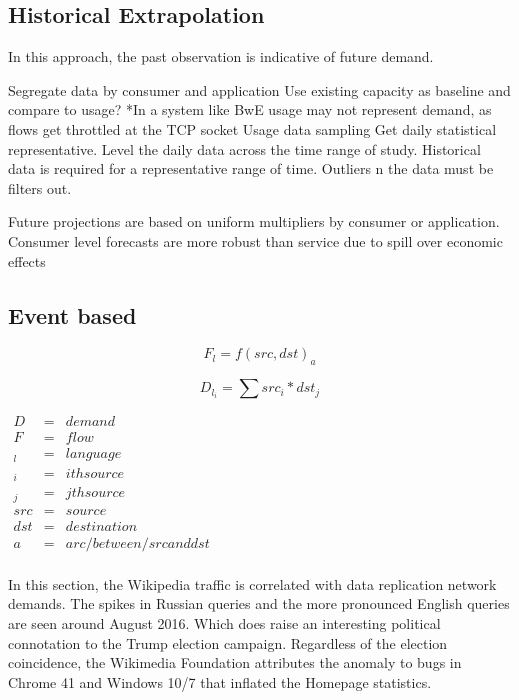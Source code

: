 \documentclass[conference]{IEEEtran}
\begin{document}
\subsection{Historical Extrapolation}
In this approach, the past observation is indicative of future demand. 

Segregate data by consumer and application
Use existing capacity as baseline and compare to usage? *In a system like BwE usage may not represent demand, as flows get throttled at the TCP socket
Usage data sampling
	Get daily statistical representative.
	Level the daily data across the time range of study.
	Historical data is required for a representative range of time. Outliers n the data must be filters out.
	
Future projections are based on uniform multipliers by consumer or application. 
Consumer level forecasts are more robust than service due to spill over economic effects 


\subsection{Event based}


\begin{equation}
\label{replication_time}
F_l = f(src, dst)_a  
\end{equation}

\begin{equation}
\label{replication_time}
D_{l_i} = \sum{src_i * dst_j}
\end{equation}

\begin{center}
\begin{small}
$
\begin{array}{rcl}
 D   &=& demand        \\
 F   &=& flow        \\
 _l  &=& language    \\
 _i  &=& ith source    \\
 _j  &=& jth source    \\
 src &=& source      \\
 dst &=& destination \\
 a   &=& arc/{} between/ src and dst\\
\end{array}$
\end{small}
\end{center}


In this section, the Wikipedia traffic is correlated with data replication network demands. The spikes in Russian queries and the more pronounced English queries are seen around August 2016. Which does raise an interesting political connotation to the Trump election campaign. Regardless of the election coincidence, the Wikimedia Foundation attributes the anomaly to bugs in Chrome 41 and Windows 10/7 that inflated the Homepage statistics. 
\end{document}

